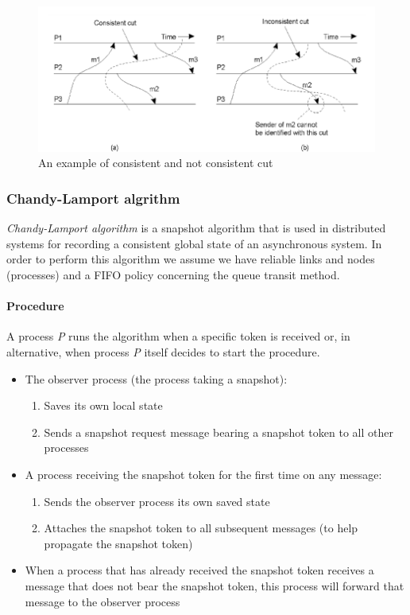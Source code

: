 \begin{figure}[h]
    \caption{An example of consistent and not consistent cut}
    \includegraphics[scale=0.5]{src/images/synchronization/consistent-cut.png}
    \centering
\end{figure}

\subsubsection{Chandy-Lamport algrithm}
\textit{Chandy-Lamport algorithm} is a snapshot algorithm that is used in distributed systems for recording a consistent global state of an asynchronous system. In order to perform this algorithm we assume we have reliable links and nodes (processes) and a FIFO policy concerning the queue transit method. 

\paragraph{Procedure}
A process \textit{P} runs the algorithm when a specific token is received or, in alternative, when process \textit{P} itself decides to start the procedure.
\begin{itemize}
    \item The observer process (the process taking a snapshot):
    \begin{enumerate}
        \item Saves its own local state
        \item Sends a snapshot request message bearing a snapshot token to all other processes
    \end{enumerate}
    \item A process receiving the snapshot token for the first time on any message:
    \begin{enumerate}
        \item Sends the observer process its own saved state
        \item Attaches the snapshot token to all subsequent messages (to help propagate the snapshot token)
    \end{enumerate}
    \item When a process that has already received the snapshot token receives a message that does not bear the snapshot token, this process will forward that message to the observer process
\end{itemize}

